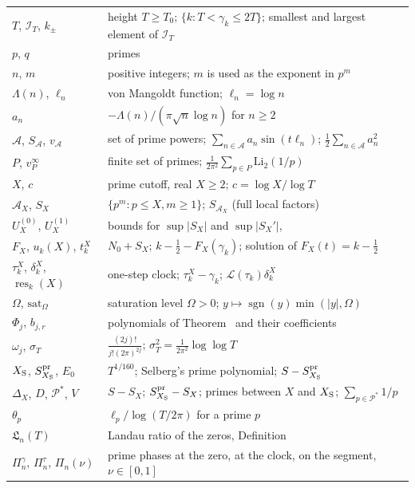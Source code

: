 \documentclass[11pt,reqno]{amsart}
\makeatletter
\let\CG@origref\ref
\let\CG@origeqref\eqref
\newcommand{\CG@gettip}[1]{\@ifundefined{CGTip@#1}{Reference: #1}{\csname CGTip@#1\endcsname}}
\DeclareRobustCommand{\CGref}[1]{\pdftooltip{\CG@origref{#1}}{\CG@gettip{#1}}}
\DeclareRobustCommand{\CGeqref}[1]{\pdftooltip{\CG@origeqref{#1}}{\CG@gettip{#1}}}
\numberwithin{equation}{section}
\theoremstyle{plain}
\theoremstyle{definition}
\theoremstyle{remark}
\newcommand{\NO}{N_0}
\newcommand{\lL}{\mathcal L}
\newcommand{\IT}{\mathcal I_T}
\newcommand{\sgn}{\operatorname{sgn}}
\newcommand{\Lan}{\mathfrak L}
\newcommand{\res}{\operatorname{res}}
\makeatother
\begin{document}
\begin{center}
\begin{longtable}{p{}p{}}
$T$, $\IT$, $k_\pm$ & height $T\ge T_0$; $\{k:T<\gamma_k\le2T\}$; smallest and largest element of $\IT$\\
$p$, $q$ & primes\\
$n$, $m$ & positive integers; $m$ is used as the exponent in $p^m$\\
$\Lambda(n)$, $\ell_n$ & von Mangoldt function; $\ell_n=\log n$\\
$a_n$ & $-\Lambda(n)/(\pi\sqrt n\log n)$ for $n\ge2$\\
$\mathcal A$, $S_{\mathcal A}$, $v_{\mathcal A}$ & set of prime powers; $\sum_{n\in\mathcal A}a_n\sin(t\ell_n)$; $\frac12\sum_{n\in\mathcal A}a_n^2$\\
$P$, $v^\infty_P$ & finite set of primes; $\frac1{2\pi^2}\sum_{p\in P}\mathrm{Li}_2(1/p)$\\
$X$, $c$ & prime cutoff, real $X\ge2$; $c=\log X/\log T$\\
$\mathcal A_X$, $S_X$ & $\{p^m:p\le X,m\ge1\}$; $S_{\mathcal A_X}$ (full local factors)\\
$U^{(0)}_X$, $U^{(1)}_X$ & bounds for $\sup|S_X|$ and $\sup|S_X'|$, \CGeqref{eq:U_def}\\
$F_X$, $u_k(X)$, $t_k^X$ & $\NO+S_X$; $k-\frac12-F_X(\gamma_k)$; solution of $F_X(t)=k-\frac12$\\
$\tau_k^X$, $\delta^X_k$, $\res_k(X)$ & one-step clock; $\tau^X_k-\gamma_k$; $\lL(\tau_k)\delta_k^X$\\
$\Omega$, $\mathrm{sat}_\Omega$ & saturation level $\Omega>0$; $y\mapsto\sgn(y)\min(|y|,\Omega)$\\
$\Phi_j$, $b_{j,r}$ & polynomials of Theorem~\CGref{thm:identity_general} and their coefficients\\
$\omega_j$, $\sigma_T$ & $\frac{(2j)!}{j!(2\pi)^{2j}}$; $\sigma_T^2=\frac1{2\pi^2}\log\log T$\\
$X_{\rm S}$, $S^{\rm pr}_{X_{\rm S}}$, $E_0$ & $T^{1/160}$; Selberg's prime polynomial; $S-S^{\rm pr}_{X_{\rm S}}$\\
$\Delta_X$, $D$, $\mathcal P^*$, $V$ & $S-S_X$; $S^{\rm pr}_{X_{\rm S}}-S_X$; primes between $X$ and $X_{\rm S}$; $\sum_{p\in\mathcal P^*}1/p$\\
$\theta_p$ & $\ell_p/\log(T/2\pi)$ for a prime $p$\\
$\Lan_n(T)$ & Landau ratio of the zeros, Definition~\CGref{def:landau_ratio}\\
$\Pi^\gamma_n$, $\Pi^\tau_n$, $\Pi_n(\nu)$ & prime phases at the zero, at the clock, on the segment, $\nu\in[0,1]$\\

\end{longtable}
\end{center}
\end{document}
